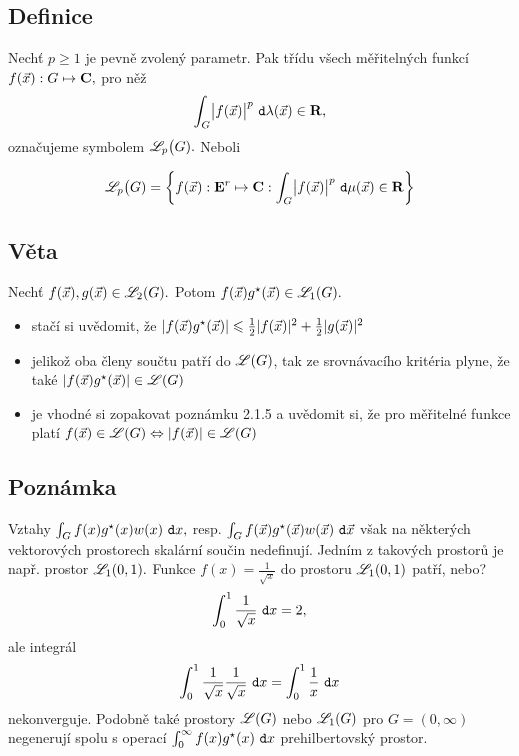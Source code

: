\subsection{Definice}

Nech\v t $p\geq 1$ je pevn\v e zvolen\'y parametr. Pak t\v r\'idu v\v sech měřitelných funkc\'i $f({\vec{x}}):G\mapsto{\mathbf C},$ pro n\v e\v z
%
$$\int_G \bigl|f({\vec{x}})\bigr|^p~\mathtt{d}\lambda({\vec{x}})\in{\mathbf R},$$
%
ozna\v cujeme symbolem ${\mathscr L}_p\bigl(G).$ Neboli

$${\mathscr L}_p\bigl(G)=\left\lbrace f({\vec{x}}):{{\mathbf E}^r}\mapsto{\mathbf C}:\int_G \bigl|f({\vec{x}})\bigr|^p~\mathtt{d}\mu({\vec{x}})\in{\mathbf R}\right\rbrace$$


\subsection{Věta}

Nechť $f({\vec{x}}), g({\vec{x}})\in {\mathscr L}_2(G).$ Potom $f({\vec{x}})g^\star({\vec{x}})\in{\mathscr L}_1(G).$\\

\Proof

\begin{itemize}
\item stačí si uvědomit, že $|f({\vec{x}})g^\star({\vec{x}})| \leqslant \frac{1}{2}|f({\vec{x}})|^2 + \frac{1}{2}|g({\vec{x}})|^2$
\item jelikož oba členy součtu patří do ${\mathscr L}(G)$, tak ze srovnávacího kritéria plyne, že také $|f({\vec{x}})g^\star({\vec{x}})|\in{\mathscr L}(G)$
\item je vhodné si zopakovat poznámku 2.1.5 a uvědomit si, že pro měřitelné funkce platí $f({\vec{x}})\in{\mathscr L}(G)\Leftrightarrow|f({\vec{x}})|\in{\mathscr L}(G)$
\end{itemize}


\subsection{Pozn\'amka}

Vztahy $\int_G f(x)g^\star(x)w(x)~\mathtt{d}x,$ resp. $\int_G f({\vec{x}})g^\star({\vec{x}})w({\vec{x}})~\mathtt{d}{\vec{x}}$ v\v sak na n\v ekter\'ych vektorov\'ych prostorech skal\'arn\'i sou\v cin nedefinuj\'i. Jedn\'im z takov\'ych prostor\r u je nap\v r. prostor ${\mathscr L}_1(0,1).$ Funkce $f(x)=\frac{1}{\sqrt{x}}$ do prostoru ${\mathscr L}_1(0,1)$ pat\v r\'i, nebo?
$$\int_0^1\frac{1}{\sqrt{x}}~\mathtt{d}x=2,$$
ale integr\'al
%
$$\int_0^1 \frac{1}{\sqrt{x}}\frac{1}{\sqrt{x}}~\mathtt{d}x=\int_0^1 \frac{1}{x}~\mathtt{d}x$$
%
nekonverguje. Podobn\v e tak\'e prostory ${\mathscr L}(G)$ nebo ${\mathscr L}_1(G)$ pro $G=(0,\infty)$ negeneruj\'i spolu s operac\'i  $\int_0^\infty f(x)g^\star(x)~\mathtt{d}x$ prehilbertovsk\'y prostor.


